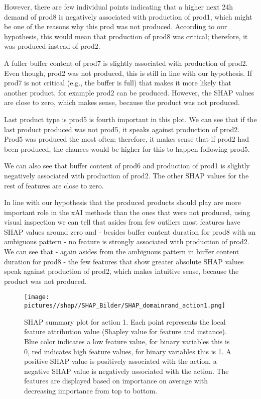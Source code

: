 However, there are few individual points indicating that a higher next 24h demand of prod8 is negatively associated with production of prod1, which might be one of the reasons why this prod was not produced. According to our hypothesis, this would mean that production of prod8 was critical; therefore, it was produced instead of prod2.

A fuller buffer content of prod7 is slightly associated with production of prod2. Even though, prod2 was not produced, this is still in line with our hypothesis. If prod7 is not critical (e.g., the buffer is full) that makes it more likely that another product, for example prod2 can be produced. However, the SHAP values are close to zero, which makes sense, because the product was not produced.

Last product type is prod5 is fourth important in this plot. We can see that if the last product produced was not prod5, it speaks against production of prod2. Prod5 was produced the most often; therefore, it makes sense that if prod2 had been produced, the chances would be higher for this to happen following prod5.

We can also see that buffer content of prod6 and production of prod1 is slightly negatively associated with production of prod2. The other SHAP values for the rest of features are close to zero.

In line with our hypothesis that the produced products should play are more important role in the xAI methods than the ones that were not produced, using visual inspection we can tell that asides from few outliers most features have SHAP values around zero and - besides buffer content duration for prod8 with an ambiguous pattern - no feature is strongly associated with production of prod2.
We can see that - again asides from the ambiguous pattern in buffer content duration for prod8 - the few features that show greater absolute SHAP values speak against production of prod2, which makes intuitive sense, because the product was not produced.

\begin{figure}[H]
    \centering
    \texttt{[image: pictures//shap//SHAP\_Bilder/SHAP\_domainrand\_action1.png]}
    \caption{SHAP summary plot for action 1.
        Each point represents the local feature attribution value (Shapley value for feature and instance).
        Blue color indicates a low feature value, for binary variables this is 0, red indicates high feature values, for binary variables this is 1. A positive SHAP value is positively associated with the action, a negative SHAP value is negatively associated with the action. The features are displayed based on importance on average with decreasing importance from top to bottom.}
    \label{fig:SHAP_Action1}
\end{figure}



